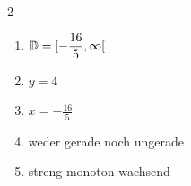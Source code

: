 \begin{enumerate}
\begin{multicols}{2}
\begin{enumerate}
\begin{enumerate}[label=\roman*)]
                            \item $\operatorname{\mathbb{D}}=[-\dfrac{16}{5},\infty[$
                            \item $y=4$
                            \item $x=-\frac{16}{5}$
                            \item weder gerade noch ungerade
                            \item streng monoton wachsend
                        \end{enumerate}
              \end{enumerate}
          \end{multicols}
\end{enumerate}
\newpage